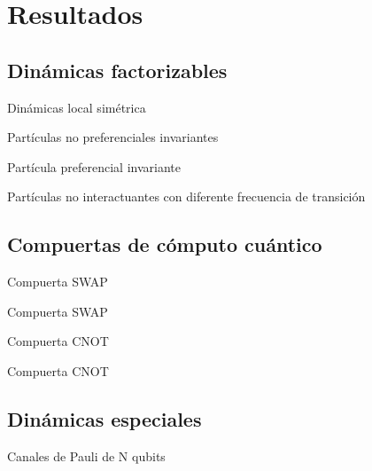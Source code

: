 \section{Resultados}

\subsection{Dinámicas factorizables}

\begin{frame}{Dinámicas local simétrica}
    \lipsum[1]
\end{frame}

\begin{frame}{Partículas no preferenciales invariantes}
    \lipsum[1]
\end{frame}

\begin{frame}{Partícula preferencial invariante}
    \lipsum[1]
\end{frame}

\begin{frame}{Partículas no interactuantes con diferente frecuencia de transición}
    \lipsum[1]
\end{frame}

\subsection{Compuertas de cómputo cuántico}

\begin{frame}{Compuerta SWAP}
    \lipsum[1]
\end{frame}

\begin{frame}{Compuerta SWAP}
    \lipsum[1]
\end{frame}

\begin{frame}{Compuerta CNOT}
    \lipsum[1]
\end{frame}

\begin{frame}{Compuerta CNOT}
    \lipsum[1]
\end{frame}

\subsection*{Dinámicas especiales}

\begin{frame}{Canales de Pauli de N qubits}
    \lipsum[1]
\end{frame}


